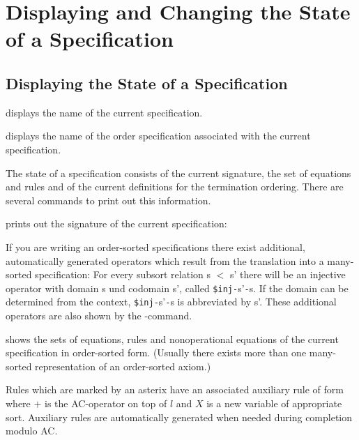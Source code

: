 \section{Displaying and Changing the State of a Specification}

\subsection{Displaying the State of a Specification}
\label{Displaying}

\begin{command}
displays the name of the current specification.
\end{command}

\begin{command}
displays the name of the order specification associated with
the current specification.
\end{command}

The state of a specification consists of the current signature, the set of equations
and rules and of the current definitions for the termination ordering. There are
several commands to print out this information.\bigskip

\begin{command}
prints out the signature of the current specification:
\end{command}

If you are writing an order-sorted specifications there exist
additional, automatically generated operators which result from the 
translation into a many-sorted specification:
For every subsort relation s $<$ s' there will be an injective operator
with domain s und codomain s', called \verb|$inj-|s'\verb|-|s. If the domain can be
determined from the context, \verb|$inj-|s'\verb|-|s is abbreviated by s'.
These additional operators are also shown by the -command.\bigskip

\begin{command}
shows the sets of equations, rules and nonoperational equations of the 
current specification in order-sorted form.
(Usually there exists more than one many-sorted representation of
an order-sorted axiom.)

Rules  which are marked by an asterix 
\kw{*} have an associated auxiliary rule of form
where $+$ is the AC-operator on top of $l$ and $X$ is a new
variable of appropriate sort.
Auxiliary rules are automatically generated when needed during
completion modulo AC.
\end{command}

